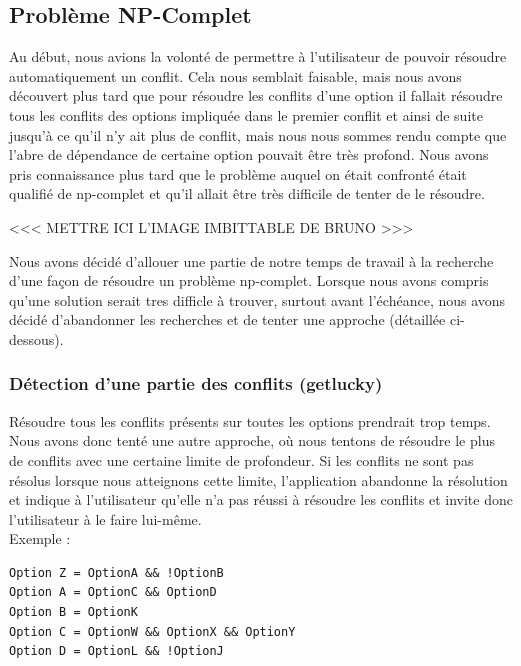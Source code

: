 \documentclass[16pts]{report}
\begin{document}
        \subsection{Problème NP-Complet}
        \label{sub:Problème NP-Complet}

Au début, nous avions la volonté de permettre à l'utilisateur de pouvoir
résoudre automatiquement un conflit. Cela nous semblait faisable, mais 
nous avons découvert plus tard que pour résoudre les conflits d'une option
il fallait résoudre tous les conflits des options impliquée dans le premier
conflit et ainsi de suite jusqu'à ce qu'il n'y ait plus de conflit, mais nous 
nous sommes rendu compte que l'abre de dépendance de certaine option pouvait être 
très profond. Nous avons pris connaissance plus tard que le problème auquel on 
était confronté était qualifié de np-complet et qu'il allait être très difficile
de tenter de le résoudre. 

<<< METTRE ICI L'IMAGE IMBITTABLE DE BRUNO >>>

Nous avons décidé d'allouer une partie de notre temps de travail à la recherche
d'une façon de résoudre un problème np-complet. Lorsque nous avons compris 
qu'une solution serait tres difficle à trouver, surtout avant l'échéance, nous
avons décidé d'abandonner les recherches et de tenter une approche (détaillée
ci-dessous).


        \subsubsection{Détection d'une partie des conflits (getlucky)}
            \label{sub:Problème NP-Complet (getlucky)}

Résoudre tous les conflits présents sur toutes les options prendrait trop temps.
Nous avons donc tenté une autre approche, où nous tentons de résoudre le plus 
de conflits avec une certaine limite de profondeur. Si les conflits ne sont pas
résolus lorsque nous atteignons cette limite, l'application abandonne la 
résolution et indique à l'utilisateur qu'elle n'a pas réussi à résoudre les 
conflits et invite donc l'utilisateur à le faire lui-même.\\

Exemple :\\
\begin{lstlisting}
Option Z = OptionA && !OptionB
Option A = OptionC && OptionD
Option B = OptionK
Option C = OptionW && OptionX && OptionY
Option D = OptionL && !OptionJ
\end{lstlisting}
\end{document}
